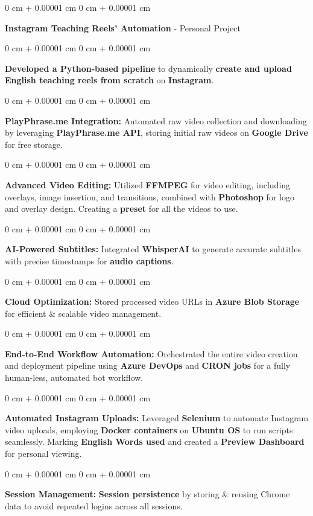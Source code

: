 \documentclass[10pt, letterpaper]{article}
\newenvironment{onecolentry}{
    \begin{adjustwidth}{
        0 cm + 0.00001 cm
    }{
        0 cm + 0.00001 cm
    }
}{
    \end{adjustwidth}
} %
\begin{document}
\vspace{0.20 cm}


\begin{onecolentry}
  \textbf{\large Instagram Teaching Reels' Automation} - Personal Project
  \begin{onecolentry}
    \textbf{Developed a Python-based pipeline} to dynamically \textbf{create and upload English teaching reels from scratch} on \textbf{Instagram}.
  \end{onecolentry}
  \begin{onecolentry}
    \textbf{PlayPhrase.me Integration:} Automated raw video collection and downloading by leveraging \textbf{PlayPhrase.me API}, storing initial raw videos on \textbf{Google Drive} for free storage.
  \end{onecolentry}
  \begin{onecolentry}
    \textbf{Advanced Video Editing:} Utilized \textbf{FFMPEG} for video editing, including overlays, image insertion, and transitions, combined with \textbf{Photoshop} for logo and overlay design. Creating a \textbf{preset} for all the videos to use.
  \end{onecolentry}
  \begin{onecolentry}
    \textbf{AI-Powered Subtitles:} Integrated \textbf{WhisperAI} to generate accurate subtitles with precise timestamps for \textbf{audio captions}.
  \end{onecolentry}
  \begin{onecolentry}
    \textbf{Cloud Optimization:} Stored processed video URLs in \textbf{Azure Blob Storage} for efficient \& scalable video management.
  \end{onecolentry}
  \begin{onecolentry}
    \textbf{End-to-End Workflow Automation:} Orchestrated the entire video creation and deployment pipeline using \textbf{Azure DevOps} and \textbf{CRON jobs} for a fully human-less, automated bot workflow.
  \end{onecolentry}
  \begin{onecolentry}

    \textbf{Automated Instagram Uploads:} Leveraged \textbf{Selenium} to automate Instagram video uploads, employing \textbf{Docker containers} on \textbf{Ubuntu OS} to run scripts seamlessly. Marking \textbf{English Words used} and created a \textbf{Preview Dashboard} for personal viewing.
  \end{onecolentry}
  \begin{onecolentry}
    \textbf{Session Management:} \textbf{Session persistence} by storing \& reusing Chrome data to avoid repeated logins across all sessions.
  \end{onecolentry}
\end{onecolentry}
\end{document}

